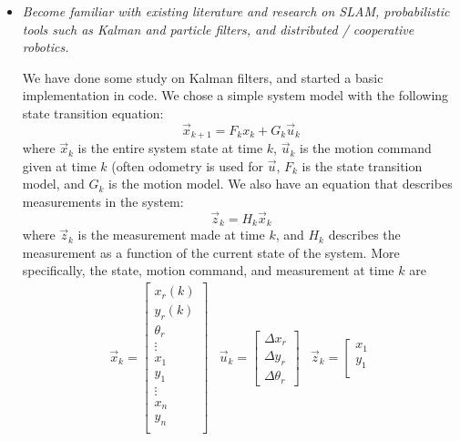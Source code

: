 \documentclass[11pt]{article}
\begin{document}
\begin{itemize}
    \item \emph{Become familiar with existing literature and research on SLAM, probabilistic tools such as Kalman and particle filters, and distributed / cooperative robotics.}

        We have done some study on Kalman filters, and started a basic implementation in code. We chose a simple system model with the following state transition equation:
        $$\vec{x}_{k+1} = F_k x_k + G_k \vec{u}_k$$
        where $\vec{x}_k$ is the entire system state at time $k$, $\vec{u}_k$ is the motion command given at time $k$ (often odometry is used for $\vec{u}$, $F_k$ is the state transition model, and $G_k$ is the motion model. We also have an equation that describes measurements in the system:
        $$\vec{z}_k = H_k \vec{x}_k$$
        where $\vec{z}_k$ is the measurement made at time $k$, and $H_k$ describes the measurement as a function of the current state of the system.  More specifically, the state, motion command, and measurement at time $k$ are
        \[ 
        \begin{array}{ccc}
            \vec{x}_k = 
            \left[
                \begin{array}{c} 
                    x_r(k) \\
                    y_r(k) \\
                    \theta_r \\
                    \vdots \\
                    x_1 \\
                    y_1 \\
                    \vdots \\
                    x_n \\
                    y_n \\
                \end{array}
            \right] &  
            \vec{u}_k = 
            \left[
                \begin{array}{c} 
                    \Delta x_r \\
                    \Delta y_r \\
                    \Delta \theta_r
                \end{array}
            \right] &  
            \vec{z}_k = 
            \left[
                \begin{array}{c} 
                    x_1 \\
                    y_1 \\

\end{array}
\end{array}\]
\end{itemize}
\end{document}
